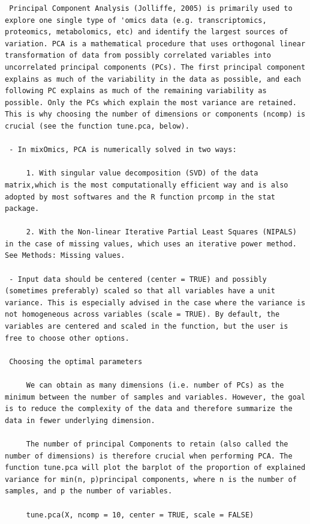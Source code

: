 \documentclass[
]{book}
\begin{document}
\begin{enumerate}
\begin{verbatim}
 Principal Component Analysis (Jolliffe, 2005) is primarily used to explore one single type of 'omics data (e.g. transcriptomics, proteomics, metabolomics, etc) and identify the largest sources of variation. PCA is a mathematical procedure that uses orthogonal linear transformation of data from possibly correlated variables into uncorrelated principal components (PCs). The first principal component explains as much of the variability in the data as possible, and each following PC explains as much of the remaining variability as possible. Only the PCs which explain the most variance are retained. This is why choosing the number of dimensions or components (ncomp) is crucial (see the function tune.pca, below).

 - In mixOmics, PCA is numerically solved in two ways:

     1. With singular value decomposition (SVD) of the data matrix,which is the most computationally efficient way and is also adopted by most softwares and the R function prcomp in the stat package.

     2. With the Non-linear Iterative Partial Least Squares (NIPALS) in the case of missing values, which uses an iterative power method. See Methods: Missing values.

 - Input data should be centered (center = TRUE) and possibly (sometimes preferably) scaled so that all variables have a unit variance. This is especially advised in the case where the variance is not homogeneous across variables (scale = TRUE). By default, the variables are centered and scaled in the function, but the user is free to choose other options.

 Choosing the optimal parameters

     We can obtain as many dimensions (i.e. number of PCs) as the minimum between the number of samples and variables. However, the goal is to reduce the complexity of the data and therefore summarize the data in fewer underlying dimension.

     The number of principal Components to retain (also called the number of dimensions) is therefore crucial when performing PCA. The function tune.pca will plot the barplot of the proportion of explained variance for min(n, p)principal components, where n is the number of samples, and p the number of variables.

     tune.pca(X, ncomp = 10, center = TRUE, scale = FALSE)
\end{verbatim}


\end{enumerate}
\end{document}
